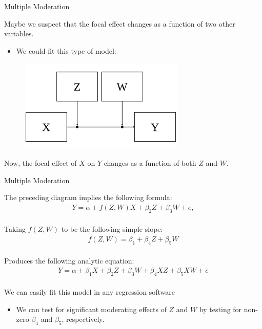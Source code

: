 \documentclass{beamer}
\newcommand{\va}[0]{\vspace{12pt}}
\newcommand{\vb}[0]{\vspace{6pt}}
\begin{document}
\begin{frame}{Multiple Moderation}
  
  Maybe we suspect that the focal effect changes as a function of two other variables.
  \begin{itemize}
    \item We could fit this type of model:
  \end{itemize}

  \begin{figure}
    \includegraphics[width=0.7\textwidth]{figures/twoModConceptual.pdf}
  \end{figure}

  Now, the focal effect of $X$ on $Y$ changes as a function of both
  $Z$ and $W$.
  
\end{frame}


\begin{frame}{Multiple Moderation}
  
  The preceding diagram implies the following formula:
  \begin{align*}
    Y = \alpha + f(Z, W) X + \beta_2Z + \beta_3W + e,
  \end{align*}\\
  \va 
  Taking $f(Z, W)$ to be the following simple slope:
  \begin{align*}
    f(Z, W) = \beta_1 + \beta_4Z + \beta_5W
  \end{align*}\\
  \va 
  Produces the following analytic equation:
  \begin{align*}
    Y = \alpha + \beta_1X + \beta_2Z + \beta_3W + \beta_4XZ + \beta_5XW + e
  \end{align*}\\
  \va
  We can easily fit this model in any regression software
  \vb
  \begin{itemize}
  \item We can test for significant moderating effects of $Z$ and $W$
    by testing for non-zero $\beta_4$ and $\beta_5$, respectively.
  \end{itemize}
  
\end{frame}
\end{document}
